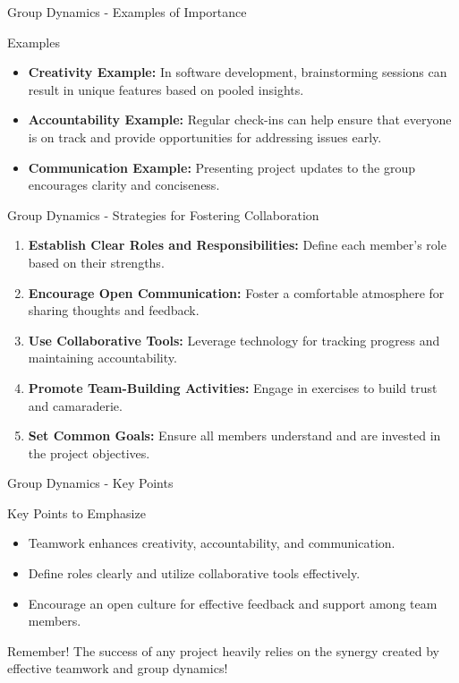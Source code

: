 \documentclass[aspectratio=169]{beamer}
\begin{document}
\begin{frame}[fragile]{Group Dynamics - Examples of Importance}
    \begin{block}{Examples}
        \begin{itemize}
            \item \textbf{Creativity Example:} In software development, brainstorming sessions can result in unique features based on pooled insights.
            \item \textbf{Accountability Example:} Regular check-ins can help ensure that everyone is on track and provide opportunities for addressing issues early.
            \item \textbf{Communication Example:} Presenting project updates to the group encourages clarity and conciseness.
        \end{itemize}
    \end{block}
\end{frame}

\begin{frame}[fragile]{Group Dynamics - Strategies for Fostering Collaboration}
    \begin{enumerate}
        \item \textbf{Establish Clear Roles and Responsibilities:} Define each member's role based on their strengths.
        \item \textbf{Encourage Open Communication:} Foster a comfortable atmosphere for sharing thoughts and feedback.
        \item \textbf{Use Collaborative Tools:} Leverage technology for tracking progress and maintaining accountability.
        \item \textbf{Promote Team-Building Activities:} Engage in exercises to build trust and camaraderie.
        \item \textbf{Set Common Goals:} Ensure all members understand and are invested in the project objectives.
    \end{enumerate}
\end{frame}

\begin{frame}[fragile]{Group Dynamics - Key Points}
    \begin{block}{Key Points to Emphasize}
        \begin{itemize}
            \item Teamwork enhances creativity, accountability, and communication.
            \item Define roles clearly and utilize collaborative tools effectively.
            \item Encourage an open culture for effective feedback and support among team members.
        \end{itemize}
    \end{block}

    \begin{alertblock}{Remember!}
        The success of any project heavily relies on the synergy created by effective teamwork and group dynamics!
    \end{alertblock}
\end{frame}
\end{document}
